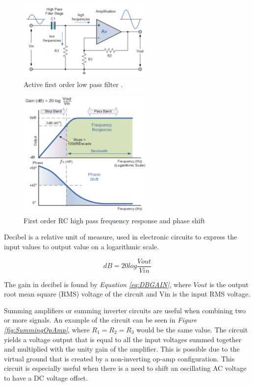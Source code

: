 \begin{figure}[h]
    \centering
    \includegraphics[width=0.60\textwidth]{graphics/highPassFilter.png}
    \caption{Active first order low pass filter \cite{noauthor_active_2013}.}
    \label{fig:HighPassFiler}
\end{figure}

\begin{figure}[h]
    \centering
    \includegraphics[width=0.60\textwidth]{graphics/highPassResponse.png}
    \caption{First order RC high pass frequency response and phase shift \cite{noauthor_high_2013}}
    \label{fig:HighPassResponse}
\end{figure}

\clearpage

Decibel is a relative unit of measure, used in electronic circuits to express the input values to output value on a logarithmic scale.  

\begin{equation}
    dB = 20log\frac{V{out}}{V{in}}
    \label{eq:DBGAIN}
\end{equation}

The gain in decibel is found by \textit{Equation \ref{eq:DBGAIN}}, where $V{out}$ is the output root mean square (RMS) voltage of the circuit and V{in} is the input RMS voltage.

Summing amplifiers or summing inverter circuits are useful when combining two or more signals.
An example of the circuit can be seen in \textit{Figure \ref{fig:SummingOpAmp}}, where $R_1 = R_2 = R_3$ would be the same value.
The circuit yields a voltage output that is equal to all the input voltages summed together and multiplied with the unity gain of the amplifier.
This is possible due to the virtual ground that is created by a non-inverting op-amp configuration\cite{noauthor_summing_2013}. 
This circuit is especially useful when there is a need to shift an oscillating AC voltage to have a DC voltage offset.


